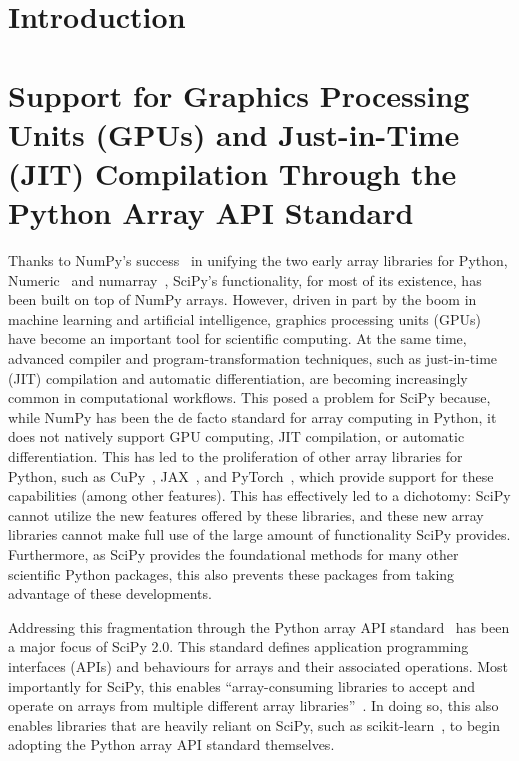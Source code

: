 \documentclass[acmsmall]{acmart}
\begin{document}
\maketitle


\section{Introduction}

\section{Support for Graphics Processing Units (GPUs) and Just-in-Time (JIT) Compilation
Through the Python Array API Standard}

Thanks to NumPy's success~\cite{Harris2020} in unifying the two early array libraries for
Python, Numeric~\cite{Dubois1996,ascher2000numerical} and
numarray~\cite{Greenfield2003numarrayA}, SciPy's functionality, for most of its
existence, has been built on top of NumPy arrays. However, driven in part
by the boom in machine learning and artificial intelligence, graphics
processing units (GPUs) have become an
important tool for scientific computing. At the same time, advanced compiler and
program-transformation techniques, such as just-in-time (JIT) compilation
and automatic differentiation, are becoming increasingly common in computational
workflows. This posed a
problem for SciPy because, while NumPy has been the de
facto standard for array computing in Python, it does not natively support GPU computing, JIT
compilation, or automatic differentiation. This has led to the proliferation of other
array libraries for Python, such as CuPy~\cite{cupy_learningsys2017},
JAX~\cite{jax2018github}, and PyTorch~\cite{Ansel2024}, which provide support for these
capabilities (among other features). This has
effectively led to a dichotomy: SciPy cannot utilize the new features offered by these
libraries, and these new array libraries cannot make full use of the large amount of
functionality SciPy provides. Furthermore, as SciPy provides the foundational methods
for many other scientific Python packages, this also prevents these packages from
taking advantage of these developments.

Addressing this fragmentation through the Python array API standard~\cite{Meurer2023} has been a
major focus of SciPy 2.0. This standard defines application
programming interfaces (APIs) and behaviours for arrays and their
associated operations. Most importantly for SciPy, this enables
``array-consuming libraries to accept and operate on arrays from multiple different
array libraries''~\cite{Meurer2023}. In doing so, this also enables libraries that are
heavily reliant on SciPy, such as scikit-learn~\cite{scikit-learn,sklearn_api}, to
begin adopting the Python array API standard themselves.
\end{document}
